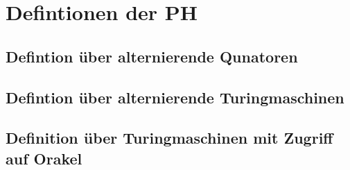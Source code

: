 \section{Defintionen der PH}

\subsection{Defintion über alternierende Qunatoren}

\subsection{Defintion über alternierende Turingmaschinen}

\subsection{Definition über Turingmaschinen mit Zugriff auf Orakel}